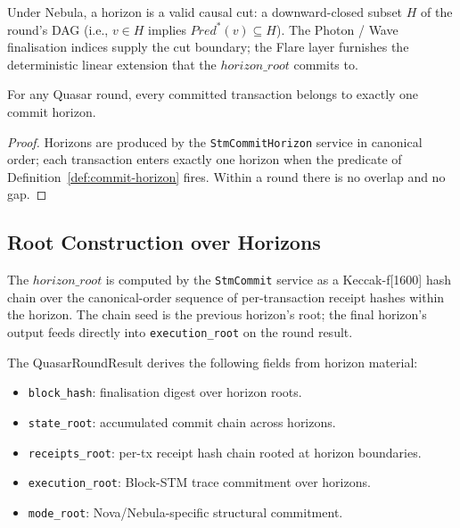 \begin{definition}
\label{def:nebula-horizon}
Under Nebula, a horizon is a valid causal cut: a downward-closed
subset $H$ of the round's DAG (i.e., $v \in H$ implies
$\mathit{Pred}^*(v) \subseteq H$). The Photon /
Wave finalisation indices supply the cut boundary; the Flare layer
furnishes the deterministic linear extension that the
$\mathit{horizon\_root}$ commits to.
\end{definition}

\begin{lemma}
\label{lem:horizon-complete}
For any Quasar round, every committed transaction belongs to exactly
one commit horizon.
\end{lemma}

\begin{proof}
Horizons are produced by the \texttt{StmCommitHorizon} service in
canonical order; each transaction enters exactly one horizon when
the predicate of Definition~\ref{def:commit-horizon} fires. Within
a round there is no overlap and no gap.
\end{proof}

\subsection{Root Construction over Horizons}

The $\mathit{horizon\_root}$ is computed by the \texttt{StmCommit}
service as a Keccak-f[1600] hash chain over the canonical-order
sequence of per-transaction receipt hashes within the horizon. The
chain seed is the previous horizon's root; the final horizon's
output feeds directly into \texttt{execution\_root} on the round
result.

\begin{definition}
\label{def:round-result-from-horizon}
The QuasarRoundResult derives the following fields from horizon
material:
\begin{itemize}[leftmargin=2em,nosep]
\item \texttt{block\_hash}: finalisation digest over horizon roots.
\item \texttt{state\_root}: accumulated commit chain across horizons.
\item \texttt{receipts\_root}: per-tx receipt hash chain rooted at
      horizon boundaries.
\item \texttt{execution\_root}: Block-STM trace commitment over
      horizons.
\item \texttt{mode\_root}: Nova/Nebula-specific structural
      commitment.
\end{itemize}
\end{definition}


